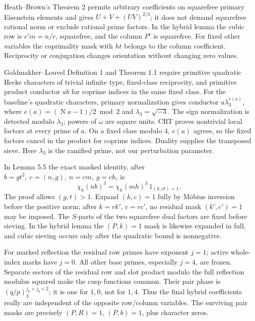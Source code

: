 \documentclass[12pt]{article}
\newcommand{\N}{\operatorname{N}}
\begin{document}
Heath--Brown's Theorem 2 permits arbitrary coefficients on squarefree
primary Eisenstein elements and gives
\(U+V+(UV)^{2/3}\); it does not demand squarefree rational norm or
exclude rational prime factors.  In the hybrid lemma the cubic row
is \(c'm=n/r\), squarefree, and the column \(P'\) is squarefree.
For fixed other variables the coprimality mask with \(ht\) belongs
to the column coefficient.  Reciprocity or conjugation changes orientation
without changing zero values.

Goldmakher--Louvel Definition 1 and Theorem 1.1 require primitive
quadratic Hecke characters of trivial infinite type, fixed-class
reciprocity, and primitive product conductor \(ab\) for coprime
indices in the same fixed class.  For the baseline's quadratic
characters, primary normalization gives conductor
\(a\lambda_3^{e(a)}\), where
\(e(a)=(\N a-1)/2\bmod2\) and \(\lambda_3=\sqrt{-3}\).
The sign normalization is detected modulo \(\lambda_3\);
powers of \(\omega\) are square units.  CRT proves nontrivial local
factors at every prime of \(a\).  On a fixed class modulo \(4\),
\(e(a)\) agrees, so the fixed factors cancel in the product for
coprime indices.  Duality supplies the transposed sieve.
Here \(\lambda_3\) is the ramified prime, not our perturbation parameter.

In Lemma 5.5 the exact masked identity, after
\(b=gt^2,\ c=(n,g),\ n=cm,\ g=ch\), is
\[
 \chi_k(nb)^3=\chi_k(mh)^3\,1_{(k,ct)=1}.
\]
The proof allows \((g,t)>1\).  Expand \((k,c)=1\) fully by
M\"obius inversion before the positive norm; after \(k=rk'\),
\(c=rc'\), no residual mask \((k',c')=1\) may be imposed.
The \(S\)-parts of the two squarefree dual factors are fixed before
sieving.  In the hybrid lemma the \((P,k)=1\) mask is likewise
expanded in full, and cubic sieving occurs only after the quadratic
bound is nonnegative.

For marked reflection the residual row primes have exponent \(j=1\);
active whole-index marks have \(j=0\).  All other base primes,
especially \(j=4\), are frozen.  Separate sectors of the residual
row and slot product modulo the full reflection modulus squared
make the cusp functions common.  Their pair phase is
\((q/p)_3^{j_p+j_q+2}\); it is one for \(1,0\), not for \(1,4\).
Thus the final hybrid coefficients really are independent of the
opposite row/column variables.  The surviving pair masks are precisely
\((P,R)=1\), \((P,b)=1\), plus character zeros.
\end{document}
